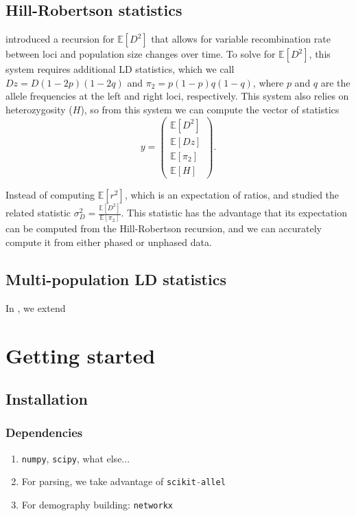 \documentclass[11pt]{article}
\makeatletter
\renewcommand{\cite}{\citep}
\newcommand{\py}[1]{\lstinline[breaklines=true,language=Python, showstringspaces=False]@#1@}
\newcommand{\E}{\mathbb{E}}
\makeatother
\begin{document}
\subsection{Hill-Robertson statistics}

\citet{Hill1968} introduced a recursion for $\E[D^2]$ that allows for variable recombination rate between loci and population size changes over time.
To solve for $\E[D^2]$, this system requires additional LD statistics, which we call $Dz = D(1-2p)(1-2q)$ and $\pi_2 = p(1-p)q(1-q)$, where $p$ and $q$ are the allele frequencies at the left and right loci, respectively.
This system also relies on heterozygosity ($H$), so from this system we can compute the vector of statistics
$$y=\begin{pmatrix} \E[D^2] \\ \E[Dz] \\ \E[\pi_2] \\ \E[H] \end{pmatrix}.$$

Instead of computing $\E[r^2]$, which is an expectation of ratios, \citet{Hill1968} and \citet{Ohta1971} studied the related statistic $\sigma_D^2 = \frac{\E[D^2]}{\E[\pi_2]}$.
This statistic has the advantage that its expectation can be computed from the Hill-Robertson recursion, and we can accurately compute it from either phased or unphased data.

\subsection{Multi-population LD statistics}
In \citet{Ragsdale2018}, we extend 


\section{Getting started}

\subsection{Installation}

\subsubsection{Dependencies}

\begin{enumerate}

\item \py{numpy}, \py{scipy}, what else...
\item For parsing, we take advantage of \py{scikit-allel} \cite{}
\item For demography building: \py{networkx}
\end{enumerate}
\end{document}

